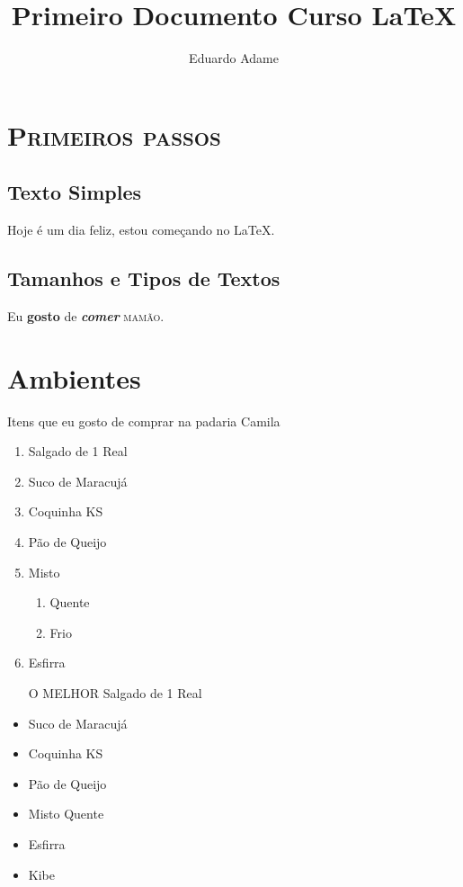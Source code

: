 \documentclass[11pt,a4paper]{article}
\author{Eduardo Adame}
\title{Primeiro Documento Curso \LaTeX}
\begin{document}
\maketitle
\newpage
\tableofcontents
\listoffigures
\newpage
\section{\textsc{Primeiros passos}}

\subsection{Texto Simples}
\label{ss:ts}
Hoje é um dia feliz, estou começando no \LaTeX .\\

\subsection{Tamanhos e Tipos de Textos}

{\Large Eu \textbf{gosto} de} \textbf{\textit{comer}} \textsc{mamão}.

\section{Ambientes}
Itens que eu gosto de comprar na padaria Camila
\begin{enumerate}
\item Salgado de 1 Real
\item Suco de Maracujá
\item Coquinha KS
\item Pão de Queijo
\item Misto 
\begin{enumerate}
\item Quente
\item Frio
\end{enumerate}
\item Esfirra 
\end{enumerate}

\begin{itemize}
\item[O MELHOR] Salgado de 1 Real
\item Suco de Maracujá
\item Coquinha KS
\item Pão de Queijo
\item Misto Quente
\item Esfirra
\item Kibe 
\end{itemize}
\end{document}
